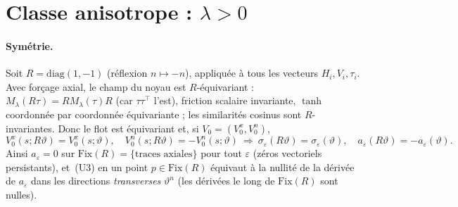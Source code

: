 \documentclass[11pt,a4paper]{article}
\theoremstyle{remark}
\newcommand{\vth}{\vartheta}
\begin{document}
\section{Classe anisotrope : $\lambda>0$}\label{sec:aniso}
\paragraph{Symétrie.} Soit $R=\mathrm{diag}(1,-1)$ (réflexion $n\mapsto-n$), appliquée à tous les vecteurs $H_i,V_i,\tau_i$. Avec forçage axial, le champ du noyau est $R$-équivariant : $M_\lambda(R\tau)=RM_\lambda(\tau)R$ (car $\tau\tau^\top$ l'est), friction scalaire invariante, $\tanh$ coordonnée par coordonnée équivariante ; les similarités cosinus sont $R$-invariantes. Donc le flot est équivariant et, si $V_0=(V_0^x,V_0^n)$,
\[
V_0^x(s;R\vth)=V_0^x(s;\vth),\quad V_0^n(s;R\vth)=-V_0^n(s;\vth)\ \Longrightarrow\ \sigma_\varepsilon(R\vth)=\sigma_\varepsilon(\vth),\quad a_\varepsilon(R\vth)=-a_\varepsilon(\vth).
\]
Ainsi $a_\varepsilon=0$ sur $\mathrm{Fix}(R)=\{\text{traces axiales}\}$ pour tout $\varepsilon$ (zéros vectoriels persistants), et~(U3) en un point $p\in\mathrm{Fix}(R)$ équivaut à la nullité de la dérivée de $a_\varepsilon$ dans les directions \emph{transverses} $\vth^n$ (les dérivées le long de $\mathrm{Fix}(R)$ sont nulles).
\end{document}

